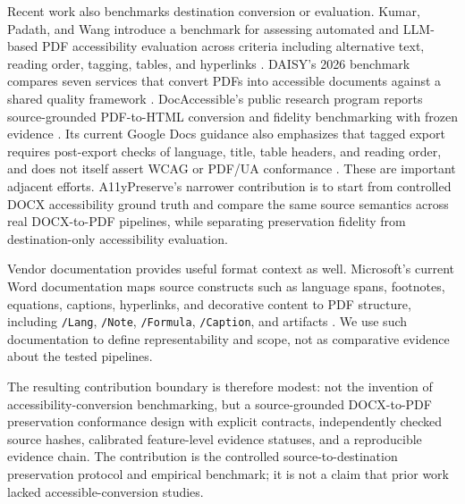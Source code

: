 Recent work also benchmarks destination conversion or evaluation. Kumar, Padath, and Wang introduce a benchmark for assessing automated and LLM-based PDF accessibility evaluation across criteria including alternative text, reading order, tagging, tables, and hyperlinks \cite{kumar2025}. DAISY's 2026 benchmark compares seven services that convert PDFs into accessible documents against a shared quality framework \cite{daisy2026}. DocAccessible's public research program reports source-grounded PDF-to-HTML conversion and fidelity benchmarking with frozen evidence \cite{docaccessible2026}. Its current Google Docs guidance also emphasizes that tagged export requires post-export checks of language, title, table headers, and reading order, and does not itself assert WCAG or PDF/UA conformance \cite{docaccessible-google}. These are important adjacent efforts. A11yPreserve's narrower contribution is to start from controlled DOCX accessibility ground truth and compare the same source semantics across real DOCX-to-PDF pipelines, while separating preservation fidelity from destination-only accessibility evaluation.

Vendor documentation provides useful format context as well. Microsoft's current Word documentation maps source constructs such as language spans, footnotes, equations, captions, hyperlinks, and decorative content to PDF structure, including \texttt{/Lang}, \texttt{/Note}, \texttt{/Formula}, \texttt{/Caption}, and artifacts \cite{microsoft-word-pdf}. We use such documentation to define representability and scope, not as comparative evidence about the tested pipelines.

The resulting contribution boundary is therefore modest: not the invention of accessibility-conversion benchmarking, but a source-grounded DOCX-to-PDF preservation conformance design with explicit contracts, independently checked source hashes, calibrated feature-level evidence statuses, and a reproducible evidence chain. The contribution is the controlled source-to-destination preservation protocol and empirical benchmark; it is not a claim that prior work lacked accessible-conversion studies.


